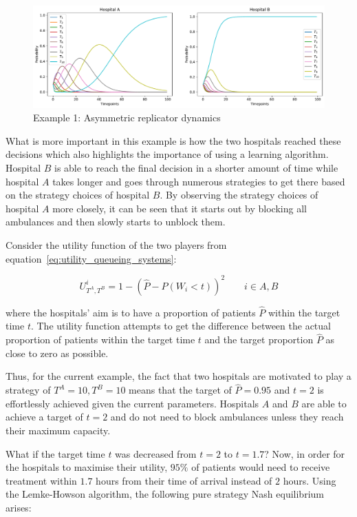 \begin{figure}[H]
    \centering
    \includegraphics[width=\linewidth]{chapters/05_numerical_results/Bin/example_1/base_case.pdf}
    \caption{Example 1: Asymmetric replicator dynamics}
    \label{fig:asymmetric_replicator_dynamics_example_1}
\end{figure}

What is more important in this example is how the two hospitals reached these
decisions which also highlights the importance of using a learning algorithm.
Hospital \(B\) is able to reach the final decision in a shorter amount of time
while  hospital \(A\) takes longer and goes through numerous strategies to get
there based on the strategy choices of hospital \(B\).
By observing the strategy choices of hospital \(A\) more closely, it can be seen
that it starts out by blocking all ambulances and then slowly starts to unblock
them.

Consider the utility function of the two players from
equation~\eqref{eq:utility_queueing_systems}:

\begin{equation*}
    U_{T^A, T^B}^i = 1 - \left( \hat{P} - P(W_i < t) \right)^2
    \qquad i \in {A, B}
\end{equation*}

where the hospitals' aim is to have a proportion of patients \(\hat{P}\)
within the target time \(t\).
The utility function attempts to get the difference between the actual
proportion of patients within the target time \(t\) and the target proportion
\(\hat{P}\) as close to zero as possible.

Thus, for the current example, the fact that two hospitals are
motivated to play a strategy of \(T^A = 10, T^B = 10\) means that the target
of \(\hat{P} = 0.95\) and \(t = 2\) is effortlessly achieved given the current
parameters.
Hospitals \(A\) and \(B\) are able to achieve a target of \(t = 2\) and do not
need to block ambulances unless they reach their maximum capacity.

What if the target time \(t\) was decreased from \(t = 2\) to \(t = 1.7\)?
Now, in order for the hospitals to maximise their utility, \(95\%\) of
patients would need to receive treatment within \(1.7\) hours from their time
of arrival instead of \(2\) hours.
Using the Lemke-Howson algorithm, the following pure strategy Nash equilibrium
arises:

